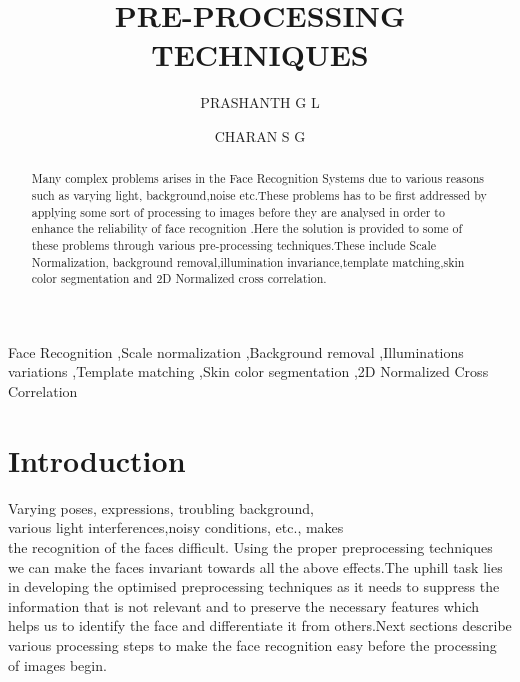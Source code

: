 \documentclass[final,3p,times,twocolumn,sort&compress]{elsarticle}
\begin{document}
\begin{frontmatter}


\makeatletter
\title{PRE-PROCESSING TECHNIQUES}
\author[S1]{PRASHANTH G L}
\author[S2]{CHARAN S G}

\address[S1]{1MS10EC083 Electronics and Comm, M S Ramaiah Institute of Technology}
\address[S2]{1MS10EC023 Electronics and Comm, M S Ramaiah Institute of Technology}

\begin{abstract}

Many complex problems arises in the Face Recognition Systems due to various reasons such as varying light, background,noise etc.These problems has to be first addressed  by applying some sort of processing to images before they are analysed in order to enhance  the reliability of  face recognition .Here the solution is provided to some of these problems through various pre-processing techniques.These include Scale Normalization, background removal,illumination invariance,template matching,skin color segmentation and 2D Normalized cross correlation.

\end{abstract}
\begin{keyword}
Face Recognition  \sep Scale normalization  \sep Background removal \sep Illuminations variations  \sep Template matching \sep Skin color segmentation \sep 2D Normalized Cross Correlation
\end{keyword}
\end{frontmatter}

\section{Introduction}
 \hspace{.11cm} Varying poses, expressions, troubling background, \\ various light interferences,noisy conditions, etc., makes \\ the recognition of the faces difficult. Using the proper preprocessing techniques we can make the faces invariant towards all the above effects.The uphill task lies in developing the optimised preprocessing techniques as it needs to suppress the information that is not relevant and to preserve the necessary features which helps us to identify the face and differentiate it from others.Next sections describe various processing steps to make the face recognition easy before the processing of images begin.
\end{document}

